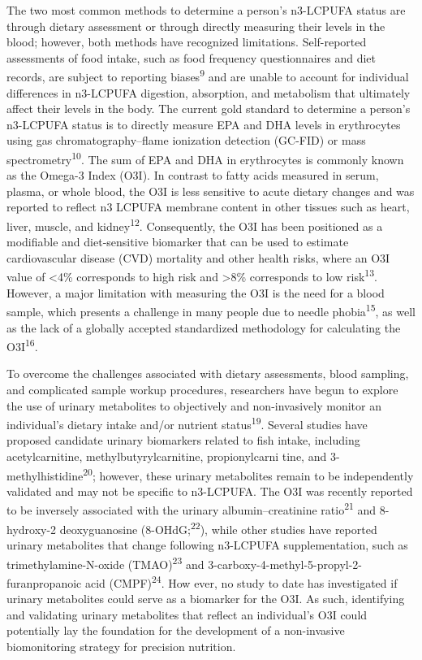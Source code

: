 \documentclass[journal=jacsat,manuscript=article]{achemso}
\begin{document}
The two most common methods to determine a person's n3-LCPUFA status are
through dietary assessment or through directly measuring their levels in
the blood; however, both methods have recognized limitations.
Self-reported assessments of food intake, such as food frequency
questionnaires and diet records, are subject to reporting
biases\textsuperscript{9} and are unable to account for individual
differences in n3-LCPUFA digestion, absorption, and metabolism that
ultimately affect their levels in the body. The current gold standard to
determine a person's n3-LCPUFA status is to directly measure EPA and DHA
levels in erythrocytes using gas chromatography--flame ionization
detection (GC-FID) or mass spectrometry\textsuperscript{10}. The sum of
EPA and DHA in erythrocytes is commonly known as the Omega-3 Index
(O3I). In contrast to fatty acids measured in serum, plasma, or whole
blood, the O3I is less sensitive to acute dietary changes and was
reported to reflect n3 LCPUFA membrane content in other tissues such as
heart, liver, muscle, and kidney\textsuperscript{12}. Consequently, the
O3I has been positioned as a modifiable and diet-sensitive biomarker
that can be used to estimate cardiovascular disease (CVD) mortality and
other health risks, where an O3I value of \textless4\% corresponds to
high risk and \textgreater8\% corresponds to low
risk\textsuperscript{13}. However, a major limitation with measuring the
O3I is the need for a blood sample, which presents a challenge in many
people due to needle phobia\textsuperscript{15}, as well as the lack of
a globally accepted standardized methodology for calculating the
O3I\textsuperscript{16}.

To overcome the challenges associated with dietary assessments, blood
sampling, and complicated sample workup procedures, researchers have
begun to explore the use of urinary metabolites to objectively and
non-invasively monitor an individual's dietary intake and/or nutrient
status\textsuperscript{19}. Several studies have proposed candidate
urinary biomarkers related to fish intake, including acetylcarnitine,
methylbutyrylcarnitine, propionylcarni tine, and
3-methylhistidine\textsuperscript{20}; however, these urinary
metabolites remain to be independently validated and may not be specific
to n3-LCPUFA. The O3I was recently reported to be inversely associated
with the urinary albumin--creatinine ratio\textsuperscript{21} and
8-hydroxy-2 deoxyguanosine (8-OHdG;\textsuperscript{22}), while other
studies have reported urinary metabolites that change following
n3-LCPUFA supplementation, such as trimethylamine-N-oxide
(TMAO)\textsuperscript{23} and
3-carboxy-4-methyl-5-propyl-2-furanpropanoic acid
(CMPF)\textsuperscript{24}. How ever, no study to date has investigated
if urinary metabolites could serve as a biomarker for the O3I. As such,
identifying and validating urinary metabolites that reflect an
individual's O3I could potentially lay the foundation for the
development of a non-invasive biomonitoring strategy for precision
nutrition.
\end{document}
